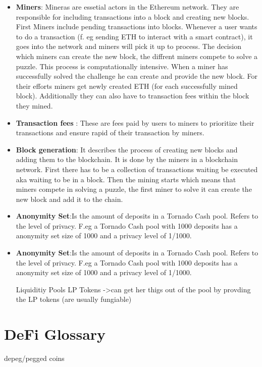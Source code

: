 \documentclass{article}
\begin{document}
\begin{itemize}
\item \textbf{Miners}: Mineras are essetial actors in the Ethereum network. They are responsible for including transactions into a block and creating new blocks. First Miners include pending transactions into blocks. Whenever a user wants to do a transaction (f. eg sending ETH to interact with a smart contract), it goes into the network and  miners will pick it up to process. The decision which miners can create the new block, the diffrent miners compete to solve a puzzle. This process is computationally intensive. When a miner has successfully solved the challenge he can create and provide the new block. For their efforts miners get newly created ETH (for each successfully mined block). Additionally they can also have to transaction fees within the block they mined.
\item \textbf{Transaction fees }:
 These are fees paid by users to miners to prioritize their transactions and ensure rapid of their transaction by miners.
\item \textbf{Block generation}: It describes the process of creating new blocks and adding them to the blockchain. It is done by the miners in a blockchain network. First there has to be a collection of transactions waiting be executed aka waiting to be in a block. Then the mining starts which means that miners compete in solving a puzzle, the first miner to solve it can create the new block and add it to the chain.
\\
\item \textbf{Anonymity Set}:Is the amount of deposits in a Tornado Cash pool. Refers to the level of privacy. F.eg a Tornado Cash pool with 1000 deposits has a anonymity set size of 1000 and a privacy level of 1/1000.




\item \textbf{Anonymity Set}:Is the amount of deposits in a Tornado Cash pool. Refers to the level of privacy. F.eg a Tornado Cash pool with 1000 deposits has a anonymity set size of 1000 and a privacy level of 1/1000.


Liquiditiy Pools
LP Tokens ->can get her thigs out of the pool by provding the LP tokens (are usually fungiable)
\end{itemize}



\section{DeFi Glossary}
depeg/pegged coins 
\end{document}
